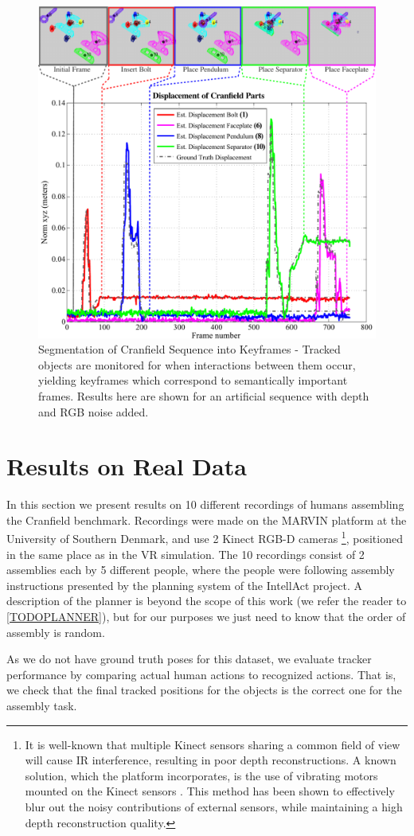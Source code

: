 \begin{figure}[!ht]
  \centering
  \includegraphics[width=\linewidth]{figures/Tracking/Action_Segmentation.pdf}
  \caption[Segmentation of Actions]{Segmentation of Cranfield Sequence into Keyframes - Tracked objects are monitored for when interactions between them occur, yielding keyframes which correspond to semantically important frames. Results here are shown for an artificial sequence with depth and RGB noise added.}
  \label{fig:ActionSegmentation}
\end{figure}

\section{Results on Real Data}
In this section we present results on 10 different recordings of humans assembling the Cranfield benchmark. Recordings were made on the MARVIN platform at the University of Southern Denmark, and use 2 Kinect RGB-D cameras \footnote{It is well-known that multiple Kinect sensors sharing a common field of view will cause IR interference, resulting in poor depth reconstructions. A known solution, which the platform incorporates, is the use of vibrating motors mounted on the Kinect sensors \cite{Butler2012}. This method has been shown to effectively blur out the noisy contributions of external sensors, while maintaining a high depth reconstruction quality.}, positioned in the same place as in the VR simulation. The 10 recordings consist of 2 assemblies each by 5 different people, where the people were following assembly instructions presented by the planning system of the IntellAct project. A description of the planner is beyond the scope of this work (we refer the reader to \ref{TODOPLANNER}), but for our purposes we just need to know that the order of assembly is random. 

As we do not have ground truth poses for this dataset, we evaluate tracker performance by comparing actual human actions to recognized actions. That is, we check that the final tracked positions for the objects is the correct one for the assembly task.

